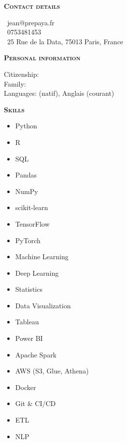 \documentclass[11pt,a4paper]{article}
\newcommand{\headleft}[1]{\vspace*{3ex}\textsc{\textbf{#1}}\par%
    \vspace*{-1.5ex}\hrulefill\par\vspace*{0.7ex}}
\begin{document}
\begin{minipage}[t]{0.33\textwidth}
{\begin{minipage}[t][293mm][t]{0.82\textwidth}
\headleft{Contact details}\small
\MVAt\ {\small jean@prepaya.fr} \\[0.4ex]
\Mobilefone\ 0753481453 \\[0.5ex]
\Letter\ 25 Rue de la Data, 75013 Paris, France
\normalsize

\headleft{Personal information}
Citizenship:  \\[0.5ex]
Family:  \\[0.5ex]
Languages:  (natif), Anglais (courant)

\headleft{Skills}
\begin{itemize}

  \item Python

  \item R

  \item SQL

  \item Pandas

  \item NumPy

  \item scikit-learn

  \item TensorFlow

  \item PyTorch

  \item Machine Learning

  \item Deep Learning

  \item Statistics

  \item Data Visualization

  \item Tableau

  \item Power BI

  \item Apache Spark

  \item AWS (S3, Glue, Athena)

  \item Docker

  \item Git & CI/CD

  \item ETL

  \item NLP

\end{itemize}

\end{minipage}\textwidth
}
\end{minipage}
\end{document}
